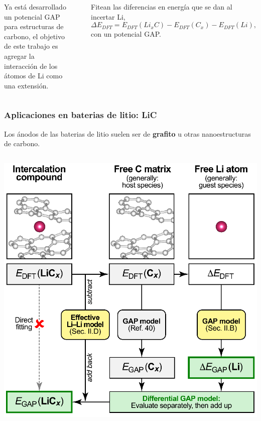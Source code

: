 \documentclass[aspectratio=169]{beamer}
\let\oldtextbf\textbf
\renewcommand{\textbf}[1]{\textcolor{nordblue}{\oldtextbf{#1}}}
\begin{document}
\begin{frame}
\begin{columns}
            \pause

            Ya está desarrollado un potencial GAP para estructuras de carbono, 
            el objetivo de este trabajo es agregar la interacción de los átomos
            de Li como una extensión.
            
            \ \pause

            Fitean las diferencias en energía que se dan al incertar Li,
            $$
            \Delta E_{DFT} = E_{DFT}(Li_xC) - E_{DFT}(C_x) - E_{DFT}(Li),
            $$
            con un potencial GAP.

        \end{columns}

    \end{frame}
    
    \begin{frame}
        \frametitle{Aplicaciones en baterias de litio: LiC}
            
        Los ánodos de las baterias de litio suelen ser de \textbf{grafito} u otras
        nanoestructuras de carbono.
        
        \begin{columns}
            \begin{center}
                \includegraphics[width=\columnwidth]{LiC-metodo.png}
            \end{center}


\end{columns}
\end{frame}
\end{document}
